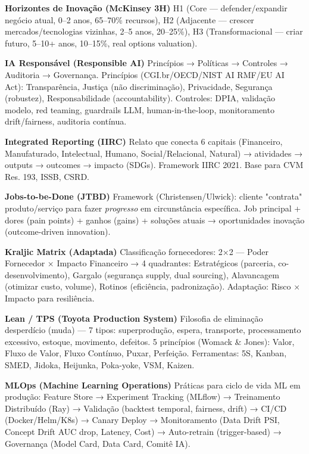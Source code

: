 \begin{ecglossario}
\item[\textbf{Horizontes de Inovação (McKinsey 3H)}] H1 (Core — defender/expandir negócio atual, 0–2 anos, 65–70\% recursos), H2 (Adjacente — crescer mercados/tecnologias vizinhas, 2–5 anos, 20–25\%), H3 (Transformacional — criar futuro, 5–10+ anos, 10–15\%, real options valuation).

\item[\textbf{IA Responsável (Responsible AI)}] Princípios → Políticas → Controles → Auditoria → Governança. Princípios (CGI.br/OECD/NIST AI RMF/EU AI Act): Transparência, Justiça (não discriminação), Privacidade, Segurança (robustez), Responsabilidade (accountability). Controles: DPIA, validação modelo, red teaming, guardrails LLM, human-in-the-loop, monitoramento drift/fairness, auditoria contínua.

\item[\textbf{Integrated Reporting (IIRC)}] Relato que conecta 6 capitais (Financeiro, Manufaturado, Intelectual, Humano, Social/Relacional, Natural) → atividades → outputs → outcomes → impacto (SDGs). Framework IIRC 2021. Base para CVM Res. 193, ISSB, CSRD.

\item[\textbf{Jobs-to-be-Done (JTBD)}] Framework (Christensen/Ulwick): cliente "contrata" produto/serviço para fazer \textit{progresso} em circunstância específica. Job principal + dores (pain points) + ganhos (gains) + soluções atuais → oportunidades inovação (outcome-driven innovation).

\item[\textbf{Kraljic Matrix (Adaptada)}] Classificação fornecedores: 2×2 — Poder Fornecedor × Impacto Financeiro → 4 quadrantes: Estratégicos (parceria, co-desenvolvimento), Gargalo (segurança supply, dual sourcing), Alavancagem (otimizar custo, volume), Rotinos (eficiência, padronização). Adaptação: Risco × Impacto para resiliência.

\item[\textbf{Lean / TPS (Toyota Production System)}] Filosofia de eliminação desperdício (muda) — 7 tipos: superprodução, espera, transporte, processamento excessivo, estoque, movimento, defeitos. 5 princípios (Womack \& Jones): Valor, Fluxo de Valor, Fluxo Contínuo, Puxar, Perfeição. Ferramentas: 5S, Kanban, SMED, Jidoka, Heijunka, Poka-yoke, VSM, Kaizen.

\item[\textbf{MLOps (Machine Learning Operations)}] Práticas para ciclo de vida ML em produção: Feature Store → Experiment Tracking (MLflow) → Treinamento Distribuído (Ray) → Validação (backtest temporal, fairness, drift) → CI/CD (Docker/Helm/K8s) → Canary Deploy → Monitoramento (Data Drift PSI, Concept Drift AUC drop, Latency, Cost) → Auto-retrain (trigger-based) → Governança (Model Card, Data Card, Comitê IA).


\end{ecglossario}
